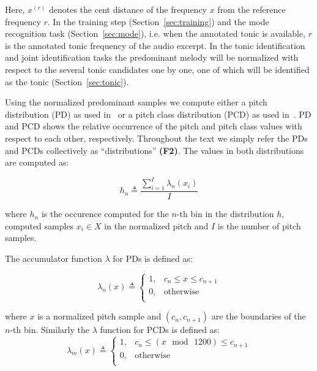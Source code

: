 \documentclass{sig-alternate}
\begin{document}
Here, $x^{(r)}$ denotes the cent distance of the frequency $x$ from the reference frequency $r$. In the training step (Section~\ref{sec:training}) and the mode recognition task (Section~\ref{sec:mode}), i.e. when the annotated tonic is available, $r$ is the annotated tonic frequency of the audio excerpt. In the tonic identification and joint identification tasks the predominant melody will be normalized with respect to the several tonic candidates one by one, one of which will be identified as the tonic (Section~\ref{sec:tonic}).

Using the normalized predominant samples we compute either a pitch distribution (PD) as used in~\cite{bozkurt_makam} or a pitch class distribution (PCD) as used in~\cite{chordia}. PD and PCD shows the relative occurrence of the pitch and pitch class values with respect to each other, respectively. Throughout the text we simply refer the PDs and PCDs collectively as ``distributions'' {\bf (F2)}. The values in both distributions are computed as:

\begin{equation}
	h_n  \triangleq \frac{\sum_{i=1}^I \lambda_n\left(x_i\right)}{I}
	\label{eqn:histogram}
\end{equation}

\noindent
where $h_{n}$ is the occurence computed for the $n$-th bin in the distribution $h$, computed samples $x_i \in X$ in the normalized pitch and $I$ is the number of pitch samples.

The accumulator function $\lambda$ for PDs is defined as:

\begin{equation}
\lambda_{n}(x) \triangleq
\begin{cases}
1, & c_{n} \leq x \leq  c_{n+1} \\
0, & \text{otherwise} \\
\end{cases}
\end{equation}

\noindent
where $x$ is a normalized pitch sample and $(c_{n}, c_{n+1})$ are the boundaries of the $n$-th bin. 
Similarly the $\lambda$ function for PCDs is defined as:
\begin{equation}
\lambda_{m}(x)  \triangleq
\begin{cases}
1, & c_{n} \leq \left(x\,\bmod\,1200\right) \leq  c_{n+1} \\
0, & \text{otherwise} \\
\end{cases}
\end{equation}
\end{document}
